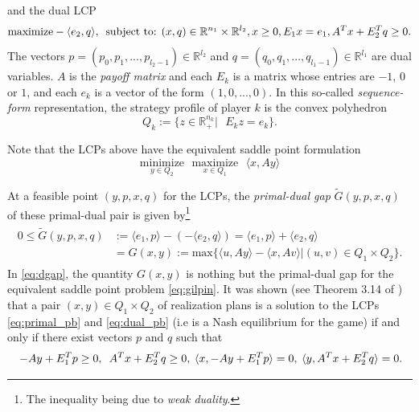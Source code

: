 \documentclass{article} %
\begin{document}
and the dual LCP
\begin{equation}
  \begin{aligned}
    \text{maximize}-\langle e_2, q\rangle,\hspace{.5em}\text{subject
      to: }(x,q) \in \mathbb{R}^{n_1} \times \mathbb{R}^{l_2},  x \ge
    0, E_1x = e_1, A^Tx + E_2^Tq \geq 0.
  \end{aligned}
  \label{eq:dual_pb}
\end{equation}
The vectors $p = (p_0, p_1, ..., p_{l_2 - 1}) \in \mathbb{R}^{l_2}$
and $q = (q_0, q_1, ..., q_{l_1 - 1}) \in \mathbb{R}^{l_1}$ are dual
variables. 
$A$ is the \textit{payoff matrix} and each $E_k$ is a matrix whose
entries are $-1$, $0$ or $1$, and each $e_k$ is a vector of the form
$(1, 0, ..., 0)$. In this so-called \textit{sequence-form}
representation, the strategy profile of player $k$ is the convex polyhedron
\begin{equation}
  Q_k := \{z \in \mathbb{R}^{n_k}_+ |\text{ }E_kz = e_k\}.
\label{eq:polyhedron}
\end{equation}

Note that the LCPs above have the equivalent saddle point formulation
\begin{equation}
  \underset{y \in Q_2}{\text{minimize}}\text{ }\underset{x \in
    Q_1}{\text{maximize}}\text{ }\langle x, Ay\rangle
  \label{eq:gilpin}
\end{equation}

At a feasible point $(y, p, x, q)$ for the LCPs, the \textit{primal-dual gap}
$\tilde{G}(y, p, x, q)$ of these primal-dual pair is given
by\footnote{The inequality being due to \textit{weak duality}.}
\begin{eqnarray}
  \begin{split}
  0 \le \tilde{G}(y, p, x, q) &:= \langle e_1, p\rangle - (-\langle
  e_2, q\rangle) = \langle e_1, p\rangle + \langle
  e_2, q\rangle\\
  &= G(x, y) := \mathrm{max}\{\langle u, Ay\rangle - \langle x, Av\rangle |
(u,v) \in Q_1 \times Q_2\}.
\end{split}
  \label{eq:dgap}
\end{eqnarray}
In \eqref{eq:dgap}, the quantity $G(x, y)$ is nothing but the primal-dual
gap for the equivalent saddle point problem \eqref{eq:gilpin}.
It was shown (see Theorem 3.14 of \cite{vonequilibrium}) that a pair
$(x, y) \in Q_1 \times Q_2$ of realization plans is a solution to the
LCPs \eqref{eq:primal_pb} and \eqref{eq:dual_pb} (i.e is a Nash
equilibrium for the game)  if and only if there exist vectors $p$ and
$q$ such that
\begin{equation}
\hspace{.25em} -Ay + E_1^Tp \ge 0, \hspace{.5em}A^Tx + E_2^Tq \ge
0, \hspace{.25em} \langle x, -Ay + E_1^Tp\rangle = 0, \hspace{.25em}
\langle y, A^Tx  + E_2^Tq\rangle = 0.
\label{eq:feasibility}
\end{equation}
\end{document}
